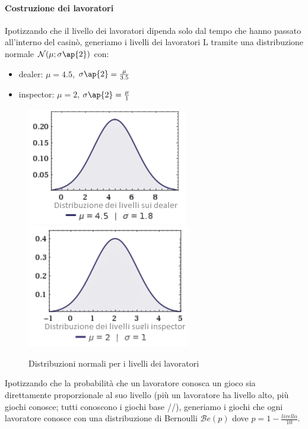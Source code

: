     \paragraph{Costruzione dei lavoratori} Ipotizzando che il livello dei lavoratori dipenda solo dal tempo che hanno passato all'interno del casinò, generiamo i livelli dei lavoratori L tramite una distribuzione normale $\mathcal{N}(\mu;\sigma \ap{2})$ con:
    \begin{itemize}
        \item dealer: $\mu = 4.5$, $\sigma \ap{2} = \frac{\mu}{3.5}$
        \item inspector: $\mu = 2$, $\sigma \ap{2} = \frac{\mu}{1}$
    \end{itemize}
     \begin{figure}[!htb]
         \begin{widepage}
             \centering
             \includegraphics[width=.49\textwidth]{../immagini/livelli_dealer.png}\hfil
             \includegraphics[width=.49\textwidth]{../immagini/livelli_insp.png}
             \caption{Distribuzioni normali per i livelli dei lavoratori}
         \end{widepage}
     \end{figure}
     \FloatBarrier
     \noindent
     Ipotizzando che la probabilità che un lavoratore conosca un gioco sia direttamente proporzionale al suo livello (più un lavoratore ha livello alto, più giochi conosce; tutti conoscono i giochi base //), generiamo i giochi che ogni lavoratore conosce con una distribuzione di Bernoulli $\mathcal{B}e(p)$ dove $p = 1 - \frac{livello}{10}$.
